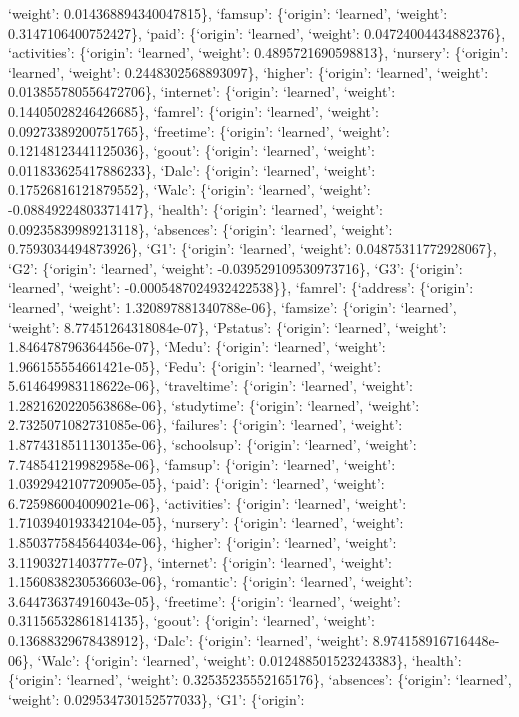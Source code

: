 \documentclass[
]{article}
\begin{document}
`weight': 0.014368894340047815\}, `famsup': \{`origin': `learned',
`weight': 0.3147106400752427\}, `paid': \{`origin': `learned', `weight':
0.04724004434882376\}, `activities': \{`origin': `learned', `weight':
0.4895721690598813\}, `nursery': \{`origin': `learned', `weight':
0.2448302568893097\}, `higher': \{`origin': `learned', `weight':
0.013855780556472706\}, `internet': \{`origin': `learned', `weight':
0.14405028246426685\}, `famrel': \{`origin': `learned', `weight':
0.09273389200751765\}, `freetime': \{`origin': `learned', `weight':
0.12148123441125036\}, `goout': \{`origin': `learned', `weight':
0.011833625417886233\}, `Dalc': \{`origin': `learned', `weight':
0.17526816121879552\}, `Walc': \{`origin': `learned', `weight':
-0.08849224803371417\}, `health': \{`origin': `learned', `weight':
0.09235839989213118\}, `absences': \{`origin': `learned', `weight':
0.7593034494873926\}, `G1': \{`origin': `learned', `weight':
0.04875311772928067\}, `G2': \{`origin': `learned', `weight':
-0.039529109530973716\}, `G3': \{`origin': `learned', `weight':
-0.0005487024932422538\}\}, `famrel': \{`address': \{`origin':
`learned', `weight': 1.320897881340788e-06\}, `famsize': \{`origin':
`learned', `weight': 8.77451264318084e-07\}, `Pstatus': \{`origin':
`learned', `weight': 1.846478796364456e-07\}, `Medu': \{`origin':
`learned', `weight': 1.966155554661421e-05\}, `Fedu': \{`origin':
`learned', `weight': 5.614649983118622e-06\}, `traveltime': \{`origin':
`learned', `weight': 1.2821620220563868e-06\}, `studytime': \{`origin':
`learned', `weight': 2.7325071082731085e-06\}, `failures': \{`origin':
`learned', `weight': 1.8774318511130135e-06\}, `schoolsup': \{`origin':
`learned', `weight': 7.748541219982958e-06\}, `famsup': \{`origin':
`learned', `weight': 1.0392942107720905e-05\}, `paid': \{`origin':
`learned', `weight': 6.725986004009021e-06\}, `activities': \{`origin':
`learned', `weight': 1.7103940193342104e-05\}, `nursery': \{`origin':
`learned', `weight': 1.8503775845644034e-06\}, `higher': \{`origin':
`learned', `weight': 3.11903271403777e-07\}, `internet': \{`origin':
`learned', `weight': 1.1560838230536603e-06\}, `romantic': \{`origin':
`learned', `weight': 3.644736374916043e-05\}, `freetime': \{`origin':
`learned', `weight': 0.31156532861814135\}, `goout': \{`origin':
`learned', `weight': 0.13688329678438912\}, `Dalc': \{`origin':
`learned', `weight': 8.974158916716448e-06\}, `Walc': \{`origin':
`learned', `weight': 0.012488501523243383\}, `health': \{`origin':
`learned', `weight': 0.32535235552165176\}, `absences': \{`origin':
`learned', `weight': 0.029534730152577033\}, `G1': \{`origin':
\end{document}
